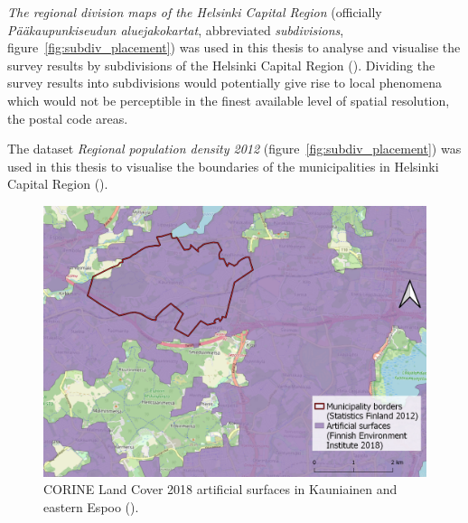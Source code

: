 \textit{The regional division maps of the Helsinki Capital Region} (officially \textit{Pääkaupunkiseudun aluejakokartat}, abbreviated \textit{subdivisions}, figure~\ref{fig:subdiv_placement}) was used in this thesis to analyse and visualise the survey results by subdivisions of the Helsinki Capital Region (\cite{HelsinginEspoonVantaanjaKauniaistenmittausorganisaatiot2011}). Dividing the survey results into subdivisions would potentially give rise to local phenomena which would not be perceptible in the finest available level of spatial resolution, the postal code areas.

The dataset \textit{Regional population density 2012} (figure~\ref{fig:subdiv_placement}) was used in this thesis to visualise the boundaries of the municipalities in Helsinki Capital Region (\cite{StatisticsFinland2012}). 

\newpage
\begin{figure}[H]%
    \centering
    \includegraphics[width=.88\textwidth]{images/thesis_data_artificial.png}
    \caption[CORINE Land Cover 2018 artificial surfaces in Kauniainen and eastern Espoo.]{CORINE Land Cover 2018 artificial surfaces in Kauniainen and eastern Espoo (\cite{OpenStreetMap}).}%
    \label{fig:datalayers_corine}%
\end{figure}

